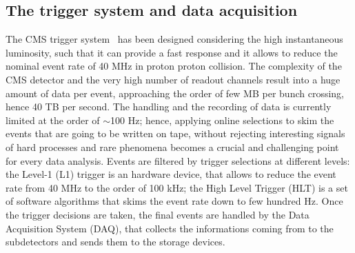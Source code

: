 
\subsection{The trigger system and data acquisition}
The CMS trigger system~\cite{TRIG-TDR} has been designed considering the high instantaneous luminosity, such that it can provide a fast response and it allows to reduce the nominal event rate of 40 MHz in proton proton collision. The complexity of the CMS detector and the very high number of readout channels result into a huge amount of data per event, approaching the order of few MB per bunch crossing, hence 40 TB per second. The handling and the recording of data is currently limited at the order of $\sim$100 Hz; hence, applying online selections to skim the events that are going to be written on tape, without rejecting interesting signals of hard processes and rare phenomena becomes a crucial and challenging point for every data analysis. Events are filtered by trigger selections at different levels: the Level-1 (L1) trigger is an hardware device, that allows to reduce the event rate from 40 MHz to the order of 100 kHz; the High Level Trigger (HLT) is a set of software algorithms that skims the event rate down to few hundred Hz. Once the trigger decisions are taken, the final events are handled by the Data Acquisition System (DAQ), that collects the informations coming from to the subdetectors and sends them to the storage devices.

